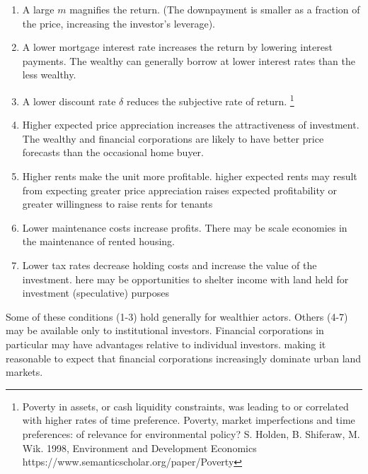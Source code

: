 \begin{enumerate}
\item A large $m$ magnifies the return. (The downpayment is smaller as a fraction of the price, increasing the investor's leverage). 

\item A lower mortgage interest rate increases the return by lowering interest payments.  The wealthy can generally borrow  at lower interest rates than the less wealthy. 

\item A lower discount rate $\delta$ reduces the subjective rate of return.  \footnote{Poverty in assets, or cash liquidity constraints, was leading to or correlated with higher rates of time preference. Poverty, market imperfections and time preferences: of relevance for environmental policy?   S. Holden, B. Shiferaw, M. Wik.  1998, Environment and Development Economics https://www.semanticscholar.org/paper/Poverty %
}
\item Higher expected price appreciation increases the attractiveness of investment. The wealthy and financial corporations  are likely to have better price forecasts than  the occasional home buyer.
\item Higher rents make the unit more profitable. higher expected  rents may result from expecting greater price appreciation raises expected profitability or greater willingness to raise rents for tenants 

\item Lower maintenance costs increase profits. There may be scale economies in the maintenance  of rented housing. 
\item Lower tax rates decrease holding costs and increase the value of the investment. here may be opportunities to shelter income with land held for investment (speculative) purposes
\end{enumerate}

Some  of these conditions (1-3) hold generally for wealthier actors. Others (4-7) may be available only to institutional investors.  Financial corporations in particular may have advantages relative to individual investors. making it  reasonable to expect that financial corporations increasingly dominate urban land markets. %

